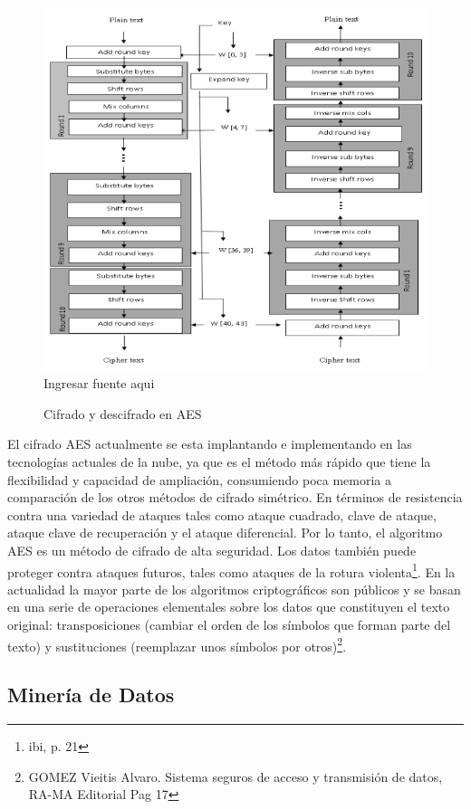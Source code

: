 \documentclass[a4paper,openright,12pt]{book}
\theoremstyle{definition}
\theoremstyle{remark}
\begin{document}
\begin{figure}[htb]
\centering
\caption{Cifrado y descifrado en AES} 
\includegraphics[scale=0.3]{AES}
\label{fig:CifradoAES}
\\Ingresar fuente aqui
\end{figure}

El cifrado AES actualmente se esta implantando e implementando en las tecnologías actuales de la nube, ya que es el método más rápido que tiene la flexibilidad y capacidad de ampliación, consumiendo poca memoria a comparación de los otros métodos de cifrado simétrico. En términos de resistencia contra una variedad de ataques tales como ataque cuadrado, clave de ataque, ataque clave de recuperación y el ataque diferencial. Por lo tanto, el algoritmo AES es un método de cifrado de alta seguridad. Los datos también puede proteger contra ataques futuros, tales como ataques de la rotura violenta\footnote{ibi, p. 21}. En la actualidad la mayor parte de los algoritmos criptográficos son públicos y se basan en una serie de operaciones elementales sobre los datos que constituyen el texto original: transposiciones (cambiar el orden de los símbolos que forman parte del texto) y sustituciones  (reemplazar unos símbolos por otros)\footnote{GOMEZ Vieitis Alvaro. Sistema seguros de acceso y transmisión de datos, RA-MA Editorial Pag 17}.

\subsection{Minería de Datos}
\end{document}
